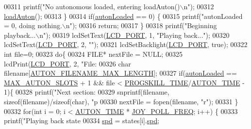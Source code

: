 \begin{DoxyCode}
{{{{{{{{{{{{{{{{{{{{{{{{{{{{{{{{{{{{{{{{00311         printf(\textcolor{stringliteral}{"No autonomous loaded, entering loadAuton()\(\backslash\)n"});
00312         \hyperlink{autonrecorder_8c_af6d130061f44459f9b3c629123e78f6e}{loadAuton}();
00313     \}
00314     \textcolor{keywordflow}{if}(\hyperlink{autonrecorder_8c_a4e72d907ee74449b71b5e20943f4217e}{autonLoaded} == 0) \{
00315         printf(\textcolor{stringliteral}{"autonLoaded = 0, doing nothing.\(\backslash\)n"});
00316         \textcolor{keywordflow}{return};
00317     \} 
00318     printf(\textcolor{stringliteral}{"Beginning playback...\(\backslash\)n"});
00319     lcdSetText(\hyperlink{lcdmsg_8h_abcf42bd88b3c36193f301ca25b033875}{LCD\_PORT}, 1, \textcolor{stringliteral}{"Playing back..."});
00320     lcdSetText(\hyperlink{lcdmsg_8h_abcf42bd88b3c36193f301ca25b033875}{LCD\_PORT}, 2, \textcolor{stringliteral}{""});
00321     lcdSetBacklight(\hyperlink{lcdmsg_8h_abcf42bd88b3c36193f301ca25b033875}{LCD\_PORT}, \textcolor{keyword}{true});
00322     \textcolor{keywordtype}{int} file=0;
00323     \textcolor{keywordflow}{do}\{
00324         FILE* nextFile = NULL;
00325         lcdPrint(\hyperlink{lcdmsg_8h_abcf42bd88b3c36193f301ca25b033875}{LCD\_PORT}, 2, \textcolor{stringliteral}{"File: %
00326         \textcolor{keywordtype}{char} filename[\hyperlink{autonrecorder_8h_a9411d1482daa18dd8221c30db7fc6e4e}{AUTON\_FILENAME\_MAX\_LENGTH}];
00327         \textcolor{keywordflow}{if}(\hyperlink{autonrecorder_8c_a4e72d907ee74449b71b5e20943f4217e}{autonLoaded} == \hyperlink{autonrecorder_8h_a5173a11a545cb4020fdd139552dc15c1}{MAX\_AUTON\_SLOTS} + 1 && file < 
      \hyperlink{autonrecorder_8h_a5e27ac66dea6c2da6239f967e72208e2}{PROGSKILL\_TIME}/\hyperlink{autonrecorder_8h_aa19f7c427989a0a67f55958c610d0355}{AUTON\_TIME} - 1)\{
00328             printf(\textcolor{stringliteral}{"Next section: %
00329             snprintf(filename, \textcolor{keyword}{sizeof}(filename)/\textcolor{keyword}{sizeof}(\textcolor{keywordtype}{char}), \textcolor{stringliteral}{"p%
00330             nextFile = fopen(filename, \textcolor{stringliteral}{"r"});
00331         \}
00332         \textcolor{keywordflow}{for}(\textcolor{keywordtype}{int} i = 0; i < \hyperlink{autonrecorder_8h_aa19f7c427989a0a67f55958c610d0355}{AUTON\_TIME} * \hyperlink{autonrecorder_8h_a3d2260a30e7ce727bef0402edee4b205}{JOY\_POLL\_FREQ}; i++) \{
00333             printf(\textcolor{stringliteral}{"Playing back state %
00334             \hyperlink{opcontrol_8c_a642ce334330c8b0f6e33dd0a3fa65111}{spd} = states[i].\hyperlink{structjoy_state_a7867156ddb5bc22d57010c5af00c98af}{spd};
}}}}}}}}}}}}}}}}}}}}}}}}}}}}}}}}}}}}}}}}}}}}
\end{DoxyCode}
